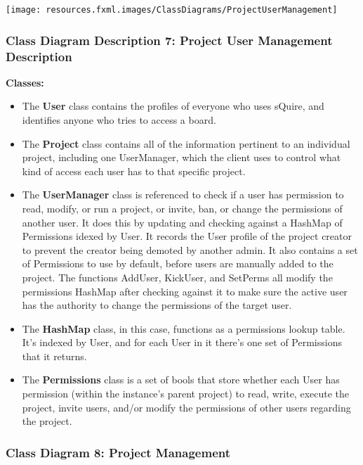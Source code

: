 \documentclass[twoside,letterpaper]{article}
\begin{document}
{\texttt{[image: resources.fxml.images/ClassDiagrams/ProjectUserManagement]}

\newpage

\subsubsection[Class Diagram Description 7: Project User Management Description]{\rmfamily\bfseries\color{black}
	Class Diagram Description 7: Project User Management Description}
\hypertarget{RefHeading22059017292}{}

\textbf{Classes:}
\begin{itemize}

	\item The \textbf{User} class contains the profiles of everyone who uses sQuire, and identifies anyone who tries to access a board.
	\item The \textbf{Project} class contains all of the information pertinent to an individual project, including one UserManager, which the client uses to control what kind of access each user has to that specific project.
	\item The \textbf{UserManager} class is referenced to check if a user has permission to read, modify, or run a project, or invite, ban, or change the permissions of another user. It does this by updating and checking against a HashMap of Permissions idexed by User. It records the User profile of the project creator to prevent the creator being demoted by another admin. It also contains a set of Permissions to use by default, before users are manually added to the project.
	The functions AddUser, KickUser, and SetPerms all modify the permissions HashMap after checking against it to make sure the active user has the authority to change the permissions of the target user.
	\item The \textbf{HashMap} class, in this case, functions as a permissions lookup table. It's indexed by User, and for each User in it there's one set of Permissions that it returns.
	\item The \textbf{Permissions} class is a set of bools that store whether each User has permission (within the instance's parent project) to read, write, execute the project, invite users, and/or modify the permissions of other users regarding the project.
\end{itemize}

\newpage

\subsubsection[Class Diagram 8: Project Management]{\rmfamily\bfseries\color{black}
	Class Diagram 8: Project Management}
\hypertarget{RefHeading22059017292}{}
\bigskip

}
\end{document}
